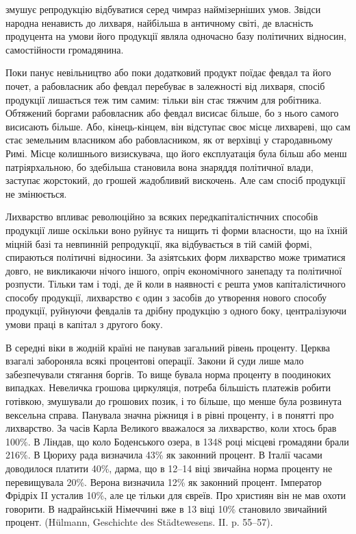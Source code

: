 \parcont{}  %
змушує репродукцію відбуватися серед чимраз наймізерніших умов. Звідси народна
ненависть до лихваря, найбільша в античному світі, де власність продуцента на
умови його продукції являла одночасно базу політичних відносин, самостійности
громадянина.

Поки панує невільництво або поки додатковий продукт поїдає февдал та
його почет, а рабовласник або февдал перебуває в залежності від лихваря,
спосіб продукції лишається теж тим самим: тільки він стає тяжчим для робітника.
Обтяжений боргами рабовласник або февдал висисає більше, бо з нього
самого висисають більше. Або, кінець-кінцем, він відступає своє місце лихвареві,
що сам стає земельним власником або рабовласником, як от верхівці
у стародавньому Римі. Місце колишнього визискувача, що його експлуатація
була більш або менш патріярхальною, бо здебільша становила вона знаряддя
політичної влади, заступає жорстокий, до грошей жадобливий вискочень. Але сам
спосіб продукції не змінюється.

Лихварство впливає революційно за всяких передкапіталістнчних способів
продукції лише оскільки воно руйнує та нищить ті форми власности, що
на їхній міцній базі та невпинній репродукції, яка відбувається в тій самій
формі, спираються політичні відносини. За азіятських форм лихварство може
триматися довго, не викликаючи нічого іншого, опріч економічного занепаду та
політичної розпусти. Тільки там і тоді, де й коли в наявності є решта умов капіталістичного
способу продукції, лихварство є один з засобів до утворення
нового способу продукції, руйнуючи февдалів та дрібну продукцію з одного боку,
централізуючи умови праці в капітал з другого боку.

В середні віки в жодній країні не панував загальний рівень проценту.
Церква взагалі забороняла всякі процентові операції. Закони й суди лише мало
забезпечували стягання боргів. То вище бувала норма проценту в поодиноких
випадках. Невеличка грошова циркуляція, потреба більшість платежів робити
готівкою, змушували до грошових позик, і то більше, що менше була розвинута
вексельна справа. Панувала значна ріжниця і в рівні проценту, і в понятті про
лихварство. За часів Карла Великого вважалося за лихварство, коли хтось брав
100\%. В Ліндав, що коло Боденського озера, в 1348 році місцеві громадяни брали
216\%. В Цюриху рада визначила 43\% як законний процент. В Італії часами
доводилося платити 40\%, дарма, що в 12--14 віці звичайна норма проценту
не перевищувала 20\%. Верона визначила 12\% як законний процент. Імператор
Фрідріх II усталив 10\%, але це тільки для євреїв. Про християн він
не мав охоти говорити. В надрайнській Німеччині вже в 13 віці 10\% становило
звичайний процент. (Hülmann, Geschichte des Städtewesens. II. p. 55--57).

